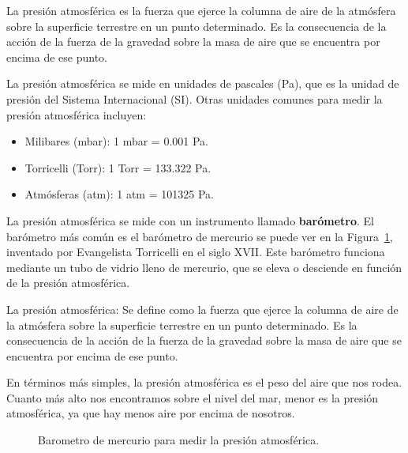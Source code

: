 \documentclass[
  us-letterpaper,
]{scrreprt}
\theoremstyle{plain}
\theoremstyle{definition}
\theoremstyle{definition}
\theoremstyle{remark}
\begin{document}
La presión atmosférica es la fuerza que ejerce la columna de aire de la
atmósfera sobre la superficie terrestre en un punto determinado. Es la
consecuencia de la acción de la fuerza de la gravedad sobre la masa de
aire que se encuentra por encima de ese punto.

La presión atmosférica se mide en unidades de pascales (Pa), que es la
unidad de presión del Sistema Internacional (SI). Otras unidades comunes
para medir la presión atmosférica incluyen:

\begin{itemize}
\item
  Milibares (mbar): 1 mbar = 0.001 Pa.
\item
  Torricelli (Torr): 1 Torr = 133.322 Pa.
\item
  Atmósferas (atm): 1 atm = 101325 Pa.
\end{itemize}

La presión atmosférica se mide con un instrumento llamado
\textbf{barómetro}. El barómetro más común es el barómetro de mercurio
se puede ver en la Figura~\ref{fig-barometro}, inventado por Evangelista
Torricelli en el siglo XVII. Este barómetro funciona mediante un tubo de
vidrio lleno de mercurio, que se eleva o desciende en función de la
presión atmosférica.

La presión atmosférica: Se define como la fuerza que ejerce la columna
de aire de la atmósfera sobre la superficie terrestre en un punto
determinado. Es la consecuencia de la acción de la fuerza de la gravedad
sobre la masa de aire que se encuentra por encima de ese punto.

En términos más simples, la presión atmosférica es el peso del aire que
nos rodea. Cuanto más alto nos encontramos sobre el nivel del mar, menor
es la presión atmosférica, ya que hay menos aire por encima de nosotros.

\begin{figure}


\caption{\label{fig-barometro}Barometro de mercurio para medir la
presión atmosférica.}

\end{figure}%
\end{document}
